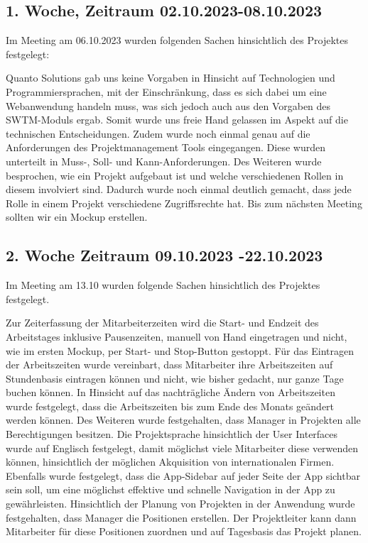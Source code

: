 \documentclass{article}
\begin{document}
\subsection{1. Woche, Zeitraum 02.10.2023-08.10.2023}
Im Meeting am 06.10.2023 wurden folgenden Sachen hinsichtlich des Projektes
festgelegt:

Quanto Solutions gab uns keine Vorgaben in Hinsicht auf Technologien und
Programmiersprachen, mit der Einschränkung, dass es sich dabei um eine
Webanwendung handeln muss, was sich jedoch auch aus den Vorgaben des
SWTM-Moduls ergab. Somit wurde uns freie Hand gelassen im Aspekt auf die
technischen Entscheidungen. Zudem wurde noch einmal genau auf die Anforderungen
des Projektmanagement Tools eingegangen. Diese wurden unterteilt in Muss-,
Soll- und Kann-Anforderungen. Des Weiteren wurde besprochen, wie ein Projekt
aufgebaut ist und welche verschiedenen Rollen in diesem involviert sind.
Dadurch wurde noch einmal deutlich gemacht, dass jede Rolle in einem Projekt
verschiedene Zugriffsrechte hat. Bis zum nächsten Meeting sollten wir ein
Mockup erstellen.

\subsection{2. Woche Zeitraum 09.10.2023 -22.10.2023}
Im Meeting am 13.10 wurden folgende Sachen hinsichtlich des Projektes
festgelegt.

Zur Zeiterfassung der Mitarbeiterzeiten wird die Start- und Endzeit des
Arbeitstages inklusive Pausenzeiten, manuell von Hand eingetragen und nicht,
wie im ersten Mockup, per Start- und Stop-Button gestoppt. Für das Eintragen
der Arbeitszeiten wurde vereinbart, dass Mitarbeiter ihre Arbeitszeiten auf
Stundenbasis eintragen können und nicht, wie bisher gedacht, nur ganze Tage
buchen können. In Hinsicht auf das nachträgliche Ändern von Arbeitszeiten wurde
festgelegt, dass die Arbeitszeiten bis zum Ende des Monats geändert werden
können. Des Weiteren wurde festgehalten, dass Manager in Projekten alle
Berechtigungen besitzen. Die Projektsprache hinsichtlich der User Interfaces
wurde auf Englisch festgelegt, damit möglichst viele Mitarbeiter diese
verwenden können, hinsichtlich der möglichen Akquisition von internationalen
Firmen. Ebenfalls wurde festgelegt, dass die App-Sidebar auf jeder Seite der
App sichtbar sein soll, um eine möglichst effektive und schnelle Navigation in
der App zu gewährleisten. Hinsichtlich der Planung von Projekten in der
Anwendung wurde festgehalten, dass Manager die Positionen erstellen. Der
Projektleiter kann dann Mitarbeiter für diese Positionen zuordnen und auf
Tagesbasis das Projekt planen.
\end{document}
